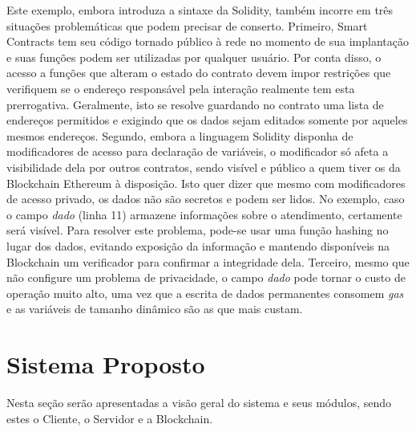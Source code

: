 \documentclass[a4paper,11pt]{article}
\begin{document}
Este exemplo, embora introduza a sintaxe da Solidity, também incorre em três situações problemáticas que podem precisar de conserto.
Primeiro, Smart Contracts tem seu código tornado público à rede no momento de sua implantação e suas funções podem ser utilizadas por qualquer usuário. %
Por conta disso, o acesso a funções que alteram o estado do contrato devem impor restrições que verifiquem se o endereço responsável pela interação realmente tem esta prerrogativa.
Geralmente, isto se resolve guardando no contrato uma lista de endereços permitidos %
e exigindo que os dados sejam editados somente por aqueles mesmos endereços.
Segundo, embora a linguagem Solidity disponha de modificadores de acesso para declaração de variáveis, o modificador só afeta a visibilidade dela por outros contratos, sendo visível e público a quem tiver os da Blockchain Ethereum à disposição.
Isto quer dizer que mesmo com modificadores de acesso privado, os dados não são secretos e podem ser lidos.
No exemplo, caso o campo \emph{dado} (linha 11) armazene informações sobre o atendimento, certamente será visível.
Para resolver este problema, pode-se usar uma função hashing no lugar dos dados, evitando exposição da informação e mantendo disponíveis na Blockchain um verificador para confirmar a integridade dela.
Terceiro, mesmo que não configure um problema de privacidade, o campo \emph{dado} pode tornar o custo de operação muito alto, uma vez que a escrita de dados permanentes consomem \emph{gas} e as variáveis de tamanho dinâmico são as que mais custam.

\newpage
\section{Sistema Proposto}
\label{sec:sistema-proposto}

Nesta seção serão apresentadas a visão geral do sistema e seus módulos, sendo estes o Cliente, o Servidor e a Blockchain.
\end{document}
